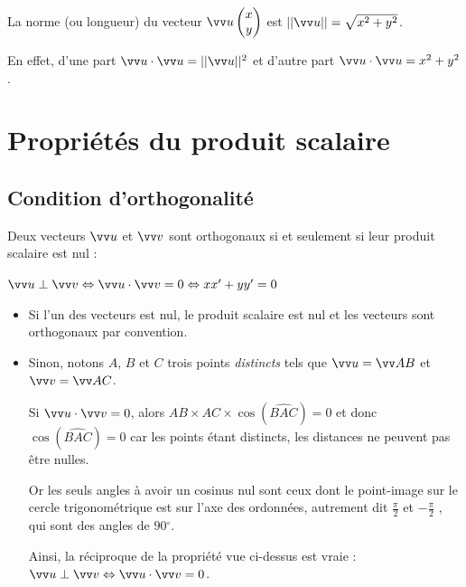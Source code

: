\documentclass[a4paper,11pt]{article}
\begin{document}
\begin{ccscq}
La norme (ou longueur) du vecteur $\coord{u}{x}{y}$ est $||\vect{u}||=\sqrt{x^2+y^2}$.

\smallskip

En effet, d'une part $\vect{u}\cdot\vect{u}=||\vect{u}||^2$ et d'autre part $\vect{u}\cdot\vect{u}=x^2+y^2$.
\end{ccscq}

\section{Propriétés du produit scalaire}

\subsection{Condition d'orthogonalité}

\begin{cthm}
Deux vecteurs $\vect{u}$ et $\vect{v}$ sont orthogonaux si et seulement si leur produit scalaire est nul :

\hfill$ \vect{u} \perp \vect{v} \ssi \vect{u} \cdot\vect{v}=0 \ssi xx'+yy'=0$\hfill~
\end{cthm}

\begin{cdemo}
\vspace{-0.2cm}
\begin{itemize}[leftmargin=*]
	\item Si l'un des vecteurs est nul, le produit scalaire est nul et les vecteurs sont orthogonaux par convention.
	\item Sinon, notons $A$, $B$ et $C$ trois points \emph{distincts} tels que $\vect{u}=\vect{AB}$ et $\vect{v}=\vect{AC}$.
	
	Si 	$\vect{u} \cdot \vect{v}=0$, alors $ AB \times AC \times \cos(\widehat{BAC})=0$ et donc $ \cos(\widehat{BAC})=0$ car les points étant distincts, les distances ne peuvent pas être nulles.
	
	Or les seuls angles à avoir un cosinus nul sont ceux dont le point-image sur le cercle trigonométrique est sur l'axe des ordonnées, autrement dit $\frac{\pi}{2}$ et $-\frac{\pi}{2}$ , qui sont des angles de $90\ensuremath{^\circ}$.
	
	Ainsi, la réciproque de la propriété vue ci-dessus est vraie :  $ \vect{u} \perp \vect{v} \ssi \vect{u}\cdot\vect{v}=0$.
\end{itemize}
\end{cdemo}
\end{document}
